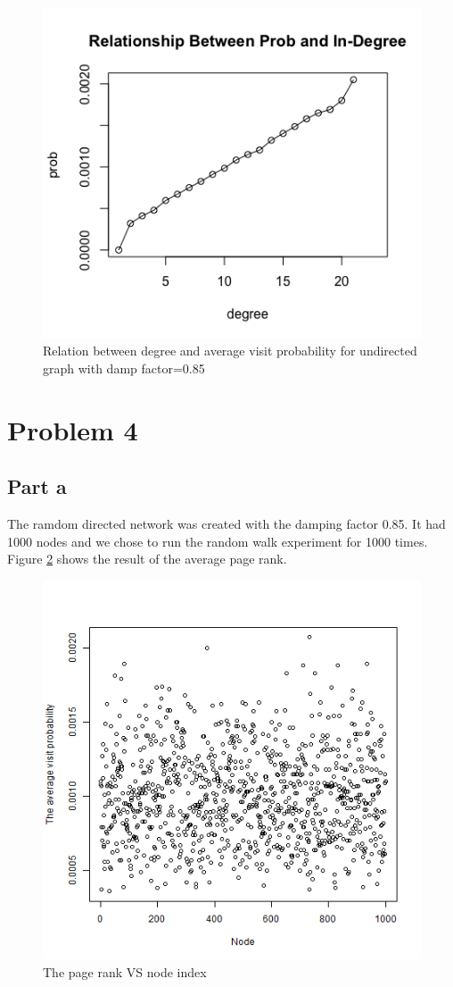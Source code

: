 \documentclass{article}
\begin{document}
\begin{figure}[htbp]
\centering
\includegraphics[width=.6\textwidth]{p3_6.png}
\caption{Relation between degree and average visit probability for undirected graph with damp factor=0.85}
\label{fig:p3_6}
\end{figure}
\newpage
\section{Problem 4}
\subsection{Part a}
The ramdom directed network was created with the damping factor 0.85. It had 1000 nodes and we chose to run the random walk experiment for 1000 times. Figure \ref{fig:p4_a} shows the result of the average page rank.
\begin{figure}[htbp]
\centering
\includegraphics[width=.6\textwidth]{p4_a.png}
\caption{The page rank VS node index}
\label{fig:p4_a}
\end{figure}
\end{document}
